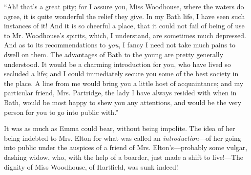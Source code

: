 

“Ah! that's a great pity; for I assure you, Miss Woodhouse, where the waters do agree, it is quite wonderful the relief they give. In my Bath life, I have seen such instances of it! And it is so cheerful a place, that it could not fail of being of use to Mr. Woodhouse's spirits, which, I understand, are sometimes much depressed. And as to its recommendations to {\em you}, I fancy I need not take much pains to dwell on them. The advantages of Bath to the young are pretty generally understood. It would be a charming introduction for you, who have lived so secluded a life; and I could immediately secure you some of the best society in the place. A line from me would bring you a little host of acquaintance; and my particular friend, Mrs. Partridge, the lady I have always resided with when in Bath, would be most happy to shew you any attentions, and would be the very person for you to go into public with.”

It was as much as Emma could bear, without being impolite. The idea of her being indebted to Mrs. Elton for what was called an {\em introduction}---of her going into public under the auspices of a friend of Mrs. Elton's---probably some vulgar, dashing widow, who, with the help of a boarder, just made a shift to live!---The dignity of Miss Woodhouse, of Hartfield, was sunk indeed!

